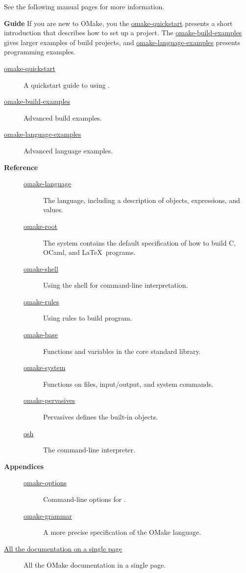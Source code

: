 %
See the following manual pages for more information.

\textbf{Guide} If you are new to OMake, you the \href{omake-quickstart.html}{omake-quickstart}
presents a short introduction that describes how to set up a project.  The
\href{omake-build-examples.html}{omake-build-examples} gives larger examples of build projects, and
\href{omake-language-examples.html}{omake-language-examples} presents programming examples.

\begin{description}
\item[\href{omake-quickstart.html}{omake-quickstart}]
%
   A quickstart guide to using .
\item[\href{omake-build-examples.html}{omake-build-examples}]
%
   Advanced build examples.
\item[\href{omake-language-examples.html}{omake-language-examples}]
%
   Advanced language examples.
\item[\textbf{Reference}]
\begin{description}
\item[\href{omake-language.html}{omake-language}]
%
   The  language, including a description of objects, expressions, and values.
\item[\href{omake-root.html}{omake-root}]
%
   The system  contains the default specification of how to build C, OCaml, and
   \LaTeX\ programs.
\item[\href{omake-shell.html}{omake-shell}]
%
   Using the  shell for command-line interpretation.
\item[\href{omake-rules.html}{omake-rules}]
%
   Using  rules to build program.
\item[\href{omake-base.html}{omake-base}]
%
   Functions and variables in the core standard library.
\item[\href{omake-system.html}{omake-system}]
%
   Functions on files, input/output, and system commands.
\item[\href{omake-pervasives.html}{omake-pervasives}]
%
   Pervasives defines the built-in objects.
\item[\href{osh.html}{osh}]
%
   The  command-line interpreter.
\end{description}
\item[\textbf{Appendices}]
\begin{description}
\item[\href{omake-options.html}{omake-options}]
%
   Command-line options for .
%
\item[\href{omake-grammar.html}{omake-grammar}]
%
   A more precise specification of the OMake language.
\end{description}
\item[\href{omake-doc.html}{All the documentation on a single page}]
%
   All the OMake documentation in a single page.
\end{description}

